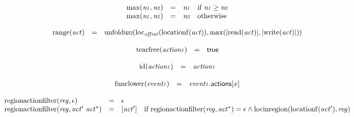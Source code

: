 $$
\begin{array}[t]{@{}lcl@{}l@{}}
{\mathrm{max}}({\mathit{n{\kern-0.1em\scriptstyle 1}}}, {\mathit{n{\kern-0.1em\scriptstyle 2}}}) & = & {\mathit{n{\kern-0.1em\scriptstyle 1}}} & \quad \mbox{if}~ {\mathit{n{\kern-0.1em\scriptstyle 1}}} \geq {\mathit{n{\kern-0.1em\scriptstyle 2}}} \\
{\mathrm{max}}({\mathit{n{\kern-0.1em\scriptstyle 1}}}, {\mathit{n{\kern-0.1em\scriptstyle 2}}}) & = & {\mathit{n{\kern-0.1em\scriptstyle 2}}} & \quad \mbox{otherwise} \\
\end{array}
$$

$$
\begin{array}[t]{@{}lcl@{}l@{}}
{\mathrm{range}}({\mathit{act}}) & = & {\mathrm{unfoldu{\kern-0.1em\scriptstyle 32}}}({\mathrm{loc}}_{\mathit{offset}}({\mathrm{locationf}}({\mathit{act}})), {\mathrm{max}}({|{\mathrm{read}}({\mathit{act}})|}, {|{\mathrm{write}}({\mathit{act}})|})) \\
\end{array}
$$

$$
\begin{array}[t]{@{}lcl@{}l@{}}
{\mathrm{tearfree}}({\mathit{action{\kern-0.1em\scriptstyle 1}}}) & = & \mathsf{true} \\
\end{array}
$$

$$
\begin{array}[t]{@{}lcl@{}l@{}}
{\mathrm{id}}({\mathit{action{\kern-0.1em\scriptstyle 1}}}) & = & {\mathit{action{\kern-0.1em\scriptstyle 1}}} \\
\end{array}
$$

$$
\begin{array}[t]{@{}lcl@{}l@{}}
{\mathrm{funclower}}({\mathit{event{\kern-0.1em\scriptstyle 1}}}) & = & {\mathit{event{\kern-0.1em\scriptstyle 1}}}{.}\mathsf{actions}{}[x] \\
\end{array}
$$

$$
\begin{array}[t]{@{}lcl@{}l@{}}
{\mathrm{regionactionfilter}}({\mathit{reg}}, \epsilon) & = & \epsilon \\
{\mathrm{regionactionfilter}}({\mathit{reg}}, {\mathit{act}'}~{{\mathit{act}}^\ast}) & = & {}[{\mathit{act}'}] & \quad \mbox{if}~ {\mathrm{regionactionfilter}}({\mathit{reg}}, {{\mathit{act}}^\ast}) = \epsilon \land {\mathrm{locinregion}}({\mathrm{locationf}}({\mathit{act}'}), {\mathit{reg}}) \\
\end{array}
$$

